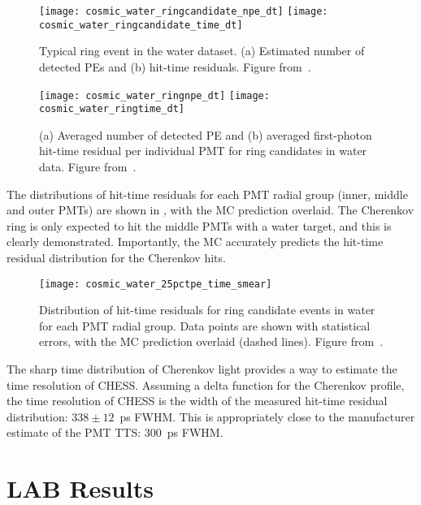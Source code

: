 \begin{figure}
\centering
\texttt{[image: cosmic\_water\_ringcandidate\_npe\_dt]}
\hfill
\texttt{[image: cosmic\_water\_ringcandidate\_time\_dt]}
\caption{Typical ring event in the water dataset. (a) Estimated number of detected PEs and (b) hit-time residuals. Figure from~\cite{chess_nim}.}
\label{fig:cosmics_water_ring_candidate}
\end{figure}


\begin{figure}
\centering
\texttt{[image: cosmic\_water\_ringnpe\_dt]}
\hfill
\texttt{[image: cosmic\_water\_ringtime\_dt]}
\caption{(a) Averaged number of detected PE and (b) averaged first-photon hit-time residual per individual PMT for ring candidates in water data. Figure from~\cite{chess_nim}.}
\label{fig:cosmics_water_npes}
\end{figure}


The distributions of hit-time residuals for each PMT radial group (inner, middle and outer PMTs) are shown in , with the MC prediction overlaid. 
The Cherenkov ring is only expected to hit the middle PMTs with a water target, and this is clearly demonstrated.
Importantly, the MC accurately predicts the hit-time residual distribution for the Cherenkov hits. 


\begin{figure}
\centering
\texttt{[image: cosmic\_water\_25pctpe\_time\_smear]}
\caption{Distribution of hit-time residuals for ring candidate events in water for each PMT radial group. Data points are shown with statistical errors, with the MC prediction overlaid (dashed lines). Figure from~\cite{chess_nim}.}
\label{fig:cosmics_water}
\end{figure}


The sharp time distribution of Cherenkov light provides a way to estimate the time resolution of CHESS.
Assuming a delta function for the Cherenkov profile, the time resolution of CHESS is the width of the measured hit-time residual distribution: $338\pm 12$~ps FWHM. 
This is appropriately close to the manufacturer estimate of the PMT TTS: 300~ps FWHM. 

\clearpage

\section{LAB Results}

